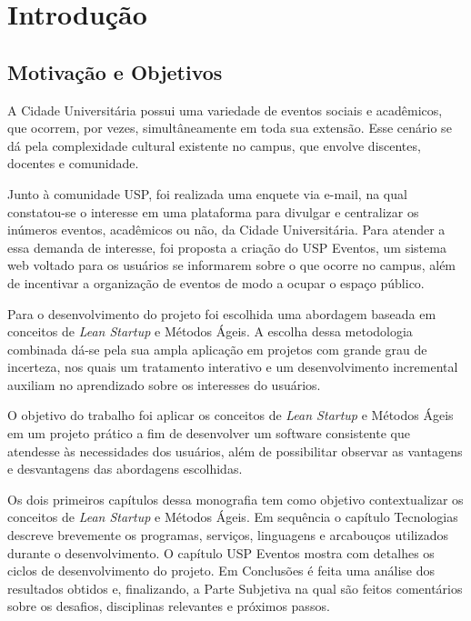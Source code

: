 \chapter{Introdução}
\label{cap:introducao}
\section{Motivação e Objetivos}

\par A Cidade Universitária possui uma variedade de eventos sociais e acadêmicos, que ocorrem, por vezes, simultâneamente em toda sua extensão. Esse cenário se dá pela complexidade cultural existente no campus, que envolve discentes, docentes e comunidade.

\par Junto à comunidade USP, foi realizada uma enquete via e-mail, na qual constatou-se o interesse em uma plataforma para divulgar e centralizar os inúmeros eventos, acadêmicos ou não, da Cidade Universitária. Para atender a essa demanda de interesse, foi proposta a criação do USP Eventos, um sistema web voltado para os usuários se informarem sobre o que ocorre no campus, além de incentivar a organização de eventos de modo a ocupar o espaço público.

\par Para o desenvolvimento do projeto foi escolhida uma abordagem baseada em conceitos de \emph{Lean Startup} e Métodos Ágeis. A escolha dessa metodologia combinada dá-se pela sua ampla aplicação em projetos com grande grau de incerteza, nos quais um tratamento interativo e um desenvolvimento incremental auxiliam no aprendizado sobre os interesses do usuários.

\par O objetivo do trabalho foi aplicar os conceitos de \emph{Lean Startup} e Métodos Ágeis em um projeto prático a fim de desenvolver um software consistente que atendesse às necessidades dos usuários, além de possibilitar observar as vantagens e desvantagens das abordagens escolhidas.

\par Os dois primeiros capítulos dessa monografia tem como objetivo contextualizar os conceitos de \emph{Lean Startup} e Métodos Ágeis. Em sequência o capítulo Tecnologias descreve brevemente os programas, serviços, linguagens e arcabouços utilizados durante o desenvolvimento. O capítulo USP Eventos mostra com detalhes os ciclos de desenvolvimento do projeto. Em Conclusões é feita uma análise dos resultados obtidos e, finalizando, a Parte Subjetiva na qual são feitos comentários sobre os desafios, disciplinas relevantes e próximos passos.
